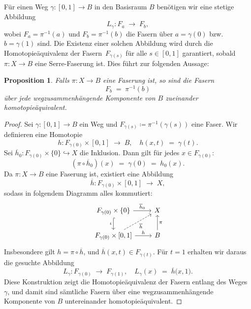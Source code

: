 \documentclass[12pt, hidelinks]{article}
\numberwithin{conj}{section}
\newtheorem{proposition}[conj]{Proposition}
\begin{document}
\smallskip

Für einen Weg \(\gamma: [0,1] \to B\) in den Basisraum \(B\) benötigen wir eine stetige Abbildung
\[
    L_\gamma : F_a \;\longrightarrow\; F_b,
\]
wobei \(F_a = \pi^{-1}(a)\) und \(F_b = \pi^{-1}(b)\) die Fasern über \(a = \gamma(0)\) bzw.\ \(b = \gamma(1)\) sind. Die Existenz einer solchen Abbildung wird durch die Homotopieäquivalenz der Fasern \(\,F_{\gamma(s)}\) für alle \(s\in[0,1]\) garantiert, sobald \(\pi : X \to B\) eine Serre-Faserung ist. Dies führt zur folgenden Aussage:

\begin{proposition}
    Falls \(\pi : X \to B\) eine Faserung ist, so sind die Fasern 
    \[
        F_b \;=\; \pi^{-1}(b)
    \]
    über jede wegzusammenhängende Komponente von \(B\) zueinander homotopieäquivalent.
\end{proposition}

\begin{proof}
    Sei \(\gamma : [0,1] \to B\) ein Weg und \(F_{\gamma(s)} \coloneqq \pi^{-1}(\gamma(s))\) eine Faser. Wir definieren eine Homotopie
    \[
        h : F_{\gamma(0)} \times [0,1] \;\longrightarrow\; B,
        \quad
        h(x,t) \;=\; \gamma(t).
    \]
    Sei \(\overline{h}_0 : F_{\gamma(0)} \times \{0\} \hookrightarrow X\) die Inklusion. Dann gilt für jedes \(x \in F_{\gamma(0)}\):
    \[
        (\pi \circ \overline{h}_0)(x) \;=\; \gamma(0)
        \;=\;
        h_0(x).
    \]
    Da \(\pi : X \to B\) eine Faserung ist, existiert eine Abbildung
    \[
        \overline{h} : F_{\gamma(0)} \times [0,1] \;\longrightarrow\; X,
    \]
    sodass in folgendem Diagramm alles kommutiert:
    \[
    \begin{tikzcd}
        F_{\gamma(0)} \times \{0\}
        \arrow[hook]{d}[swap]{\iota}
        \arrow{r}{\overline{h}_0}
        & X \\
        F_{\gamma(0)}\times[0,1]
        \arrow[dashed]{ur}[swap]{\overline{h}}
        \arrow{r}{h}
        & B \arrow{u}[swap]{\pi}
    \end{tikzcd}
    \]
    Insbesondere gilt \(h = \pi \circ \overline{h}\), und \(\overline{h}(x,t) \in F_{\gamma(t)}\). Für \(t=1\) erhalten wir daraus die gesuchte Abbildung
    \[
        L_\gamma : F_{\gamma(0)} \;\longrightarrow\; F_{\gamma(1)},
        \quad
        L_\gamma(x) \;=\; \overline{h}\bigl(x,1\bigr).
    \]
    Diese Konstruktion zeigt die Homotopieäquivalenz der Fasern entlang des Weges \(\gamma\), und damit sind sämtliche Fasern über eine wegzusammenhängende Komponente von \(B\) untereinander homotopieäquivalent.
\end{proof}
\end{document}
